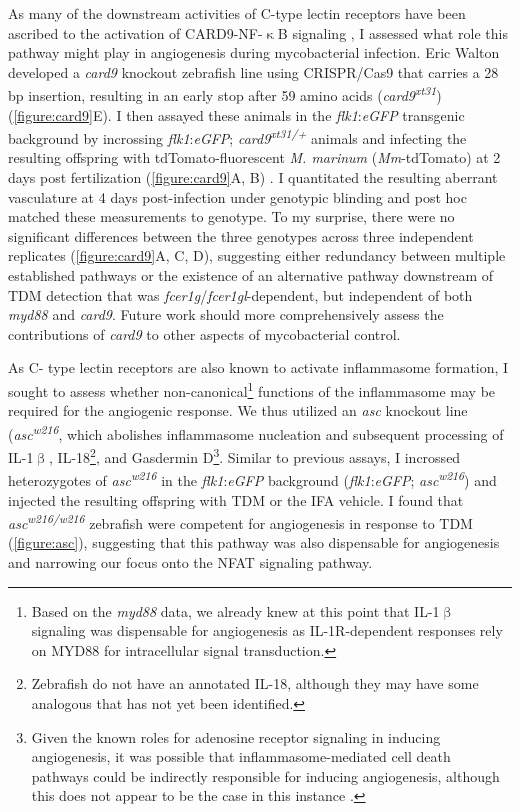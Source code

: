 As many of the downstream activities of C\hyp{}type lectin receptors have been ascribed to the activation of CARD9\hyp{}NF\hyp{}$\upkappa$B signaling \citep{Goodridge2009, LobatoPascual2013, Zhao2014, Williams2017, Deerhake2021}, I assessed what role this pathway might play in angiogenesis during mycobacterial infection. Eric Walton developed a \textit{card9} knockout zebrafish line using CRISPR/Cas9 that carries a 28 bp insertion, resulting in an early stop after 59 amino acids (\textit{card9\textsuperscript{xt31}}) (\autoref{figure:card9}E). I then assayed these animals in the \textit{flk1}:\textit{eGFP} transgenic background by incrossing \textit{flk1}:\textit{eGFP}; \textit{card9\textsuperscript{xt31/+}} animals and infecting the resulting offspring with tdTomato\hyp{}fluorescent \textit{M. marinum} (\textit{Mm}\hyp{}tdTomato) at 2 days post fertilization (\autoref{figure:card9}A, B) \citep{Jin2005, Oehlers2015}. I quantitated the resulting aberrant vasculature at 4 days post\hyp{}infection under genotypic blinding and post hoc matched these measurements to genotype. To my surprise, there were no significant differences between the three genotypes across three independent replicates (\autoref{figure:card9}A, C, D), suggesting either redundancy between multiple established pathways or the existence of an alternative pathway downstream of TDM detection that was \textit{fcer1g}/\textit{fcer1gl}\hyp{}dependent, but independent of both \textit{myd88} and \textit{card9}. Future work should more comprehensively assess the contributions of \textit{card9} to other aspects of mycobacterial control.

As C\hyp{} type lectin receptors are also known to activate inflammasome formation, I sought to assess whether non\hyp{}canonical\footnote{Based on the \textit{myd88} data, we already knew at this point that IL\hyp{}1$\upbeta$ signaling was dispensable for angiogenesis as IL\hyp{}1R\hyp{}dependent responses rely on MYD88 for intracellular signal transduction.} functions of the inflammasome may be required for the angiogenic response. We thus utilized an \textit{asc} knockout line (\textit{asc\textsuperscript{w216}}, which abolishes inflammasome nucleation and subsequent processing of IL\hyp{}1$\upbeta$, IL\hyp{}18\footnote{Zebrafish do not have an annotated IL\hyp{}18, although they may have some analogous that has not yet been identified.}, and Gasdermin D\footnote{Given the known roles for adenosine receptor signaling in inducing angiogenesis, it was possible that inflammasome\hyp{}mediated cell death pathways could be indirectly responsible for inducing angiogenesis, although this does not appear to be the case in this instance \citep{Dusseau1986, Montesinos2002, Clark2007, Auchampach2007}.}. Similar to previous assays, I incrossed heterozygotes of \textit{asc\textsuperscript{w216}} in the \textit{flk1}:\textit{eGFP} background (\textit{flk1}:\textit{eGFP}; \textit{asc\textsuperscript{w216}}) and injected the resulting offspring with TDM or the IFA vehicle. I found that \textit{asc\textsuperscript{w216/w216}} zebrafish were competent for angiogenesis in response to TDM (\autoref{figure:asc}), suggesting that this pathway was also dispensable for angiogenesis and narrowing our focus onto the NFAT signaling pathway.

